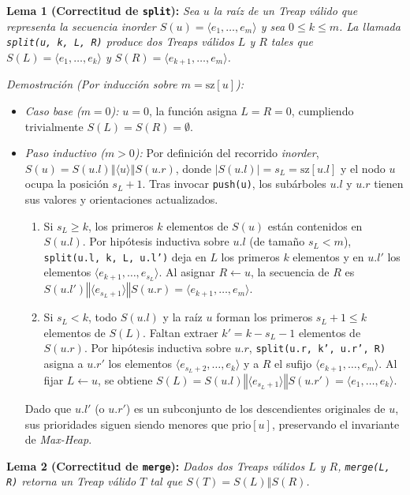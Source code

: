 \documentclass[journal,10pt,a4paper]{IEEEtran}
\begin{document}
\textbf{Lema 1 (Correctitud de \texttt{split}):} \textit{Sea $u$ la raíz de un Treap válido que representa la secuencia inorder $S(u) = \langle e_1, \dots, e_m \rangle$ y sea $0 \le k \le m$. La llamada \texttt{split(u, k, L, R)} produce dos Treaps válidos $L$ y $R$ tales que $S(L) = \langle e_1, \dots, e_k \rangle$ y $S(R) = \langle e_{k+1}, \dots, e_m \rangle$.}

\textit{Demostración (Por inducción sobre $m = \text{sz}[u]$):}
\begin{itemize}
    \item \textit{Caso base ($m = 0$):} $u = 0$, la función asigna $L = R = 0$, cumpliendo trivialmente $S(L) = S(R) = \emptyset$.
    \item \textit{Paso inductivo ($m > 0$):} Por definición del recorrido \textit{inorder}, $S(u) = S(u.l) \mathbin{\Vert} \langle u \rangle \mathbin{\Vert} S(u.r)$, donde $|S(u.l)| = s_L = \text{sz}[u.l]$ y el nodo $u$ ocupa la posición $s_L + 1$. Tras invocar \texttt{push(u)}, los subárboles $u.l$ y $u.r$ tienen sus valores y orientaciones actualizados.
    \begin{enumerate}
        \item Si $s_L \ge k$, los primeros $k$ elementos de $S(u)$ están contenidos en $S(u.l)$. Por hipótesis inductiva sobre $u.l$ (de tamaño $s_L < m$), \texttt{split(u.l, k, L, u.l')} deja en $L$ los primeros $k$ elementos y en $u.l'$ los elementos $\langle e_{k+1}, \dots, e_{s_L} \rangle$. Al asignar $R \leftarrow u$, la secuencia de $R$ es $S(u.l') \mathbin{\Vert} \langle e_{s_L+1} \rangle \mathbin{\Vert} S(u.r) = \langle e_{k+1}, \dots, e_m \rangle$.
        \item Si $s_L < k$, todo $S(u.l)$ y la raíz $u$ forman los primeros $s_L + 1 \le k$ elementos de $S(L)$. Faltan extraer $k' = k - s_L - 1$ elementos de $S(u.r)$. Por hipótesis inductiva sobre $u.r$, \texttt{split(u.r, k', u.r', R)} asigna a $u.r'$ los elementos $\langle e_{s_L+2}, \dots, e_k \rangle$ y a $R$ el sufijo $\langle e_{k+1}, \dots, e_m \rangle$. Al fijar $L \leftarrow u$, se obtiene $S(L) = S(u.l) \mathbin{\Vert} \langle e_{s_L+1} \rangle \mathbin{\Vert} S(u.r') = \langle e_1, \dots, e_k \rangle$.
    \end{enumerate}
    Dado que $u.l'$ (o $u.r'$) es un subconjunto de los descendientes originales de $u$, sus prioridades siguen siendo menores que $\text{prio}[u]$, preservando el invariante de \textit{Max-Heap}. \IEEEQED
\end{itemize}

\textbf{Lema 2 (Correctitud de \texttt{merge}):} \textit{Dados dos Treaps válidos $L$ y $R$, \texttt{merge(L, R)} retorna un Treap válido $T$ tal que $S(T) = S(L) \mathbin{\Vert} S(R)$.}
\end{document}
